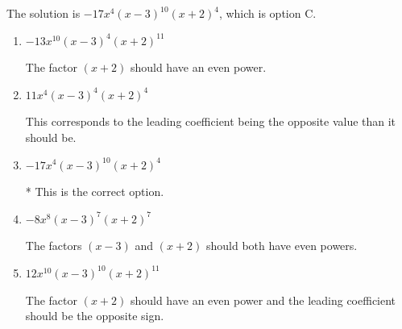 \documentclass{extbook}[14pt]
\begin{document}
\begin{enumerate}
{The solution is \( -17x^{4} (x - 3)^{10} (x + 2)^{4} \), which is option C.\begin{enumerate}[label=\Alph*.]
\item \( -13x^{10} (x - 3)^{4} (x + 2)^{11} \)

The factor $(x + 2)$ should have an even power.
\item \( 11x^{4} (x - 3)^{4} (x + 2)^{4} \)

This corresponds to the leading coefficient being the opposite value than it should be.
\item \( -17x^{4} (x - 3)^{10} (x + 2)^{4} \)

* This is the correct option.
\item \( -8x^{8} (x - 3)^{7} (x + 2)^{7} \)

The factors $(x - 3)$ and $(x + 2)$ should both have even powers.
\item \( 12x^{10} (x - 3)^{10} (x + 2)^{11} \)

The factor $(x + 2)$ should have an even power and the leading coefficient should be the opposite sign.
\end{enumerate}

}
\end{enumerate}
\end{document}
